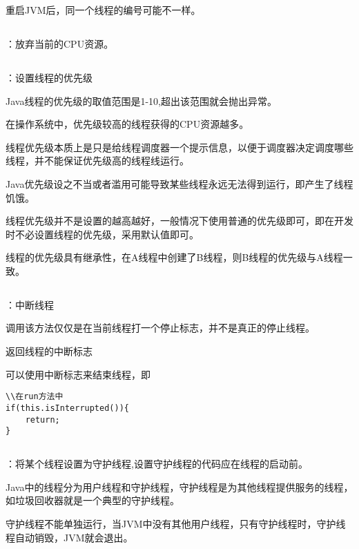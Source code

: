 \documentclass[a4paper]{report}
\begin{document}
重启JVM后，同一个线程的编号可能不一样。

\subsection{}
：放弃当前的CPU资源。
\subsection{}
：设置线程的优先级

Java线程的优先级的取值范围是1-10,超出该范围就会抛出异常。

在操作系统中，优先级较高的线程获得的CPU资源越多。

线程优先级本质上是只是给线程调度器一个提示信息，以便于调度器决定调度哪些线程，并不能保证优先级高的线程线运行。

Java优先级设之不当或者滥用可能导致某些线程永远无法得到运行，即产生了线程饥饿。

线程优先级并不是设置的越高越好，一般情况下使用普通的优先级即可，即在开发时不必设置线程的优先级，采用默认值即可。

线程的优先级具有继承性，在A线程中创建了B线程，则B线程的优先级与A线程一致。
\subsection{}
：中断线程

调用该方法仅仅是在当前线程打一个停止标志，并不是真正的停止线程。

返回线程的中断标志

可以使用中断标志来结束线程，即
\begin{lstlisting}
\\在run方法中
if(this.isInterrupted()){
    return;
}
\end{lstlisting}
\subsection{}
：将某个线程设置为守护线程,设置守护线程的代码应在线程的启动前。

Java中的线程分为用户线程和守护线程，守护线程是为其他线程提供服务的线程，如垃圾回收器就是一个典型的守护线程。

守护线程不能单独运行，当JVM中没有其他用户线程，只有守护线程时，守护线程自动销毁，JVM就会退出。
\end{document}
